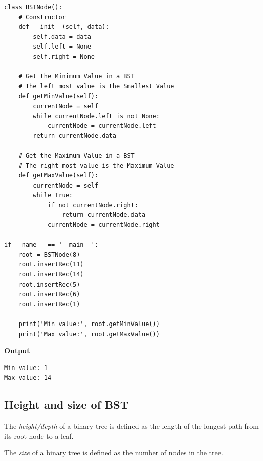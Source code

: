 \documentclass[a4paper,11pt]{book}
\begin{document}
\begin{lstlisting}
class BSTNode():
    # Constructor
    def __init__(self, data):
        self.data = data
        self.left = None
        self.right = None
    
    # Get the Minimum Value in a BST 
    # The left most value is the Smallest Value
    def getMinValue(self):
        currentNode = self
        while currentNode.left is not None:
            currentNode = currentNode.left
        return currentNode.data
        
    # Get the Maximum Value in a BST 
    # The right most value is the Maximum Value
    def getMaxValue(self):
        currentNode = self
        while True:
            if not currentNode.right:
                return currentNode.data
            currentNode = currentNode.right

if __name__ == '__main__':
    root = BSTNode(8)
    root.insertRec(11)
    root.insertRec(14)
    root.insertRec(5)
    root.insertRec(6)
    root.insertRec(1)
    
    print('Min value:', root.getMinValue())
    print('Max value:', root.getMaxValue())
\end{lstlisting}
\textbf{Output}
\begin{lstlisting}
Min value: 1
Max value: 14
\end{lstlisting}

\subsection{Height and size of BST}

\noindent The \textit{height/depth} of a binary tree is defined as the length of the longest path from its root node to a leaf. 

\noindent The \textit{size} of a binary tree is defined as the number of nodes in the tree.
\end{document}

